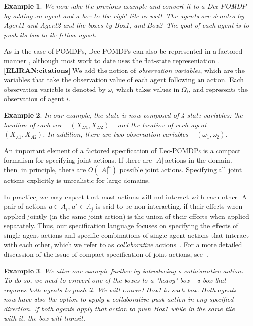 \documentclass[letterpaper]{article} %
\newtheorem{example}{Example}
\newcommand{\eliran}[1]{\textbf{[\color{red}ELIRAN:#1]}}
\begin{document}
\begin{example}
We now take the previous example and convert it to a Dec-POMDP by adding an agent and a box to the right tile as well. The agents are denoted by \emph{Agent1} and \emph{Agent2} and the boxes by \emph{Box1}, and \emph{Box2}. The goal of each agent is to push its box to its fellow agent.
\end{example}

As in the case of POMDPs, Dec-POMDPs can also be represented in a factored manner \cite{}, although most work to date uses the flat-state representation \cite{}.\eliran{citations}
We add the notion of \emph{observation variables}, which are the variables that take the observation value of each agent following an action. Each observation variable is denoted by $\omega_i$ which takes values in $\Omega_i$, and represents the observation of agent $i$.

\begin{example}
In our example, the state is now composed of 4 state variables: the location of each box -- $(X_{B1}, X_{B2})$ -- and the location of each agent -- $(X_{A1}, X_{A2})$. In addition, there are two observation variables -- $(\omega_1, \omega_2)$.
\end{example}

An important element of a factored specification of Dec-POMDPs is a compact formalism for specifying joint-actions. If there are $|A|$ actions in the domain, then, in principle, there are $O(|A|^n)$ possible joint actions. Specifying all joint actions explicitly is unrealistic for large domains. 

In practice, we may expect
that most actions will not interact with each other. A pair of actions $a\in A_i$, $a' \in A_j$ is said to be non interacting, if their effects when applied jointly (in the same joint action) is the union of their effects when applied separately.
Thus, our specification language focuses on specifying
the effects of single-agent actions and specific
combinations of single-agent actions that interact with each other, which we refer to as {\em collaborative} actions~\cite{}. For a more detailed discussion of the issue
of compact specification of joint-actions, see~\cite{}. 

\begin{example}
We alter our example further by introducing a collaborative action. To do so, we need to convert one of the boxes to a "heavy" box - a box that requires both agents to push it. We will convert \emph{Box1} to such box. Both agents now have also the option to apply a \emph{collaborative-push} action in any specified direction. If both agents apply that action to push \emph{Box1} while in the same tile with it, the box will transit.
\end{example}
\end{document}
